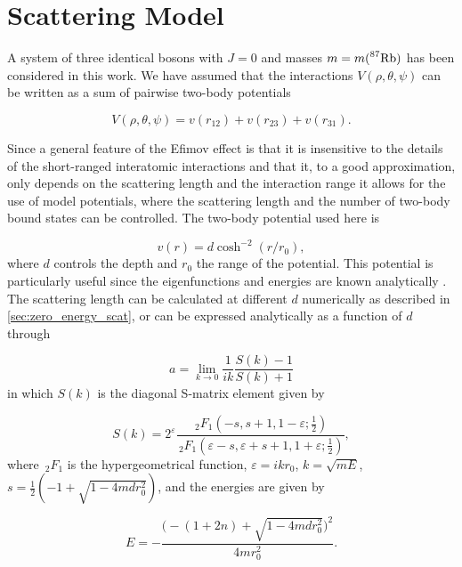 \chapter{Scattering Model}
A system of three identical bosons with $J=0$ and masses $m = m( \prescript{87}{}{\mathrm{Rb}})$ has been considered in this work. We have assumed that the interactions $V(\rho,\theta,\psi)$ can be written as a sum of pairwise two-body potentials   

\begin{equation}\label{eq:potential_sum}
V(\rho,\theta,\psi) = v(r_{12}) + v(r_{23}) + v(r_{31}).
\end{equation} 

Since a general feature of the Efimov effect is that it is insensitive to the details of the short-ranged interatomic interactions and that it, to a good approximation, only depends on the scattering length and the interaction range it allows for the use of model potentials, where the scattering length and the number of two-body bound states can be controlled. The two-body potential used here is  

\begin{equation}\label{eq:two_b_potential}
v(r) = d\cosh^{-2}{(r/r_0)},
\end{equation}
where $d$ controls the depth and $r_0$ the range of the potential.
This potential is particularly useful since the eigenfunctions and energies are known analytically \cite{Landau1965Quantum}. The scattering length can be calculated at different $d$ numerically as described in \cref{sec:zero_energy_scat}, or can be expressed analytically as a function of $d$ through 

\begin{equation}
a = \lim_{k \to 0} \frac{1}{ik} \frac{S(k)-1}{S(k)+1}
\end{equation}
in which $S(k)$ is the diagonal S-matrix element given by

\begin{equation}
S(k) = 2^{\varepsilon} \frac{\,_2F_1(-s, s+1, 1-\varepsilon;\frac{1}{2})}{\,_2F_1(\varepsilon-s, \varepsilon + s+1, 1+\varepsilon;\frac{1}{2})},
\end{equation}
where $\,_2F_1$ is the hypergeometrical function, $\varepsilon = ikr_0$, $k = \sqrt{mE}$, $s = \frac{1}{2}(-1 + \sqrt{1-4 m d r_0^2})$, and the energies are given by

\begin{equation}
E = -\frac{\Big(-(1+2n)+\sqrt{1-4mdr_0^2}\Big)^2}{4mr_0^2}.
\end{equation}


